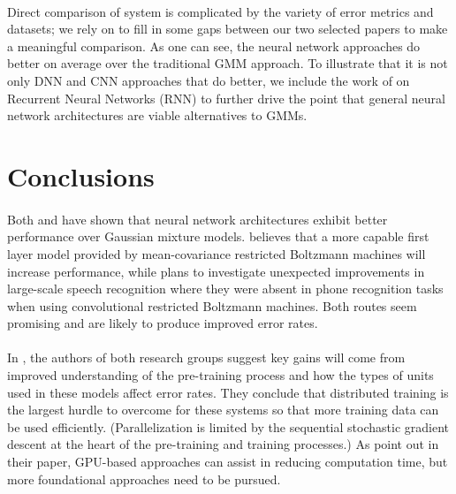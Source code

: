 \documentclass[letterpaper]{article}
\begin{document}
\paragraph{} Direct comparison of system is complicated by the variety of error metrics and datasets; we rely on \cite{DBLP:journals/spm/X12a} to fill in some gaps between our two selected papers to make a meaningful comparison. As one can see, the neural network approaches do better on average over the traditional GMM approach. To illustrate that it is not only DNN and CNN approaches that do better, we include the work of \cite{DBLP:conf/icassp/GravesMH13} on Recurrent Neural Networks (RNN) to further drive the point that general neural network architectures are viable alternatives to GMMs.

\section*{Conclusions}

\paragraph{} Both \cite{DBLP:journals/taslp/DahlYDA12} and \cite{DBLP:journals/taslp/Abdel-HamidMJDPY14} have shown that neural network architectures exhibit better performance over Gaussian mixture models. \cite{DBLP:journals/taslp/DahlYDA12} believes that a more capable first layer model provided by mean-covariance restricted Boltzmann machines will increase performance, while \cite{DBLP:journals/taslp/Abdel-HamidMJDPY14} plans to investigate unexpected improvements in large-scale speech recognition where they were absent in phone recognition tasks when using convolutional restricted Boltzmann machines. Both routes seem promising and are likely to produce improved error rates.

\paragraph{} In \cite{DBLP:journals/spm/X12a}, the authors of both research groups suggest key gains will come from improved understanding of the pre-training process and how the types of units used in these models affect error rates. They conclude that distributed training is the largest hurdle to overcome for these systems so that more training data can be used efficiently. (Parallelization is limited by the sequential stochastic gradient descent at the heart of the pre-training and training processes.) As \cite{DBLP:journals/taslp/DahlYDA12} point out in their paper, GPU-based approaches can assist in reducing computation time, but more foundational approaches need to be pursued. 
\end{document}
